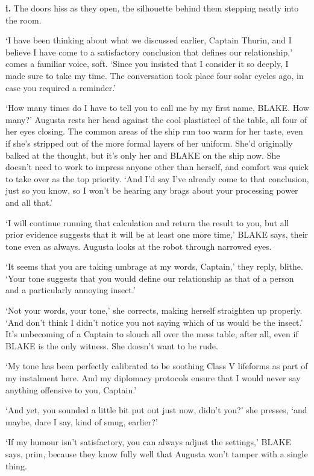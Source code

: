﻿

\textbf{i.}
The doors hiss as they open, the silhouette behind them stepping
neatly into the room.

`I have been thinking about what we discussed earlier, Captain Thurin,
and I believe I have come to a satisfactory conclusion that defines
our relationship,' comes a familiar voice, soft. `Since you insisted
that I consider it so deeply, I made sure to take my time. The
conversation took place four solar cycles ago, in case you required a
reminder.'

`How many times do I have to tell you to call me by my first name,
BLAKE. How many?' Augusta rests her head against the cool plastisteel
of the table, all four of her eyes closing. The common areas of the
ship run too warm for her taste, even if she's stripped out of the
more formal layers of her uniform. She'd originally balked at the
thought, but it's only her and BLAKE on the ship now. She doesn't need
to work to impress anyone other than herself, and comfort was quick to
take over as the top priority. `And I'd say I've already come to that
conclusion, just so you know, so I won't be hearing any brags about
your processing power and all that.'

`I will continue running that calculation and return the result to
you, but all prior evidence suggests that it will be at least one more
time,' BLAKE says, their tone even as always. Augusta looks at the
robot through narrowed eyes.

`It seems that you are taking umbrage at my words, Captain,' they
reply, blithe. `Your tone suggests that you would define our
relationship as that of a person and a particularly annoying insect.'

`Not your words, your tone,' she corrects, making herself straighten
up properly. `And don't think I didn’t notice you not saying which of
us would be the insect.' It’s unbecoming of a Captain to slouch all
over the mess table, after all, even if BLAKE is the only witness. She
doesn't want to be rude.

`My tone has been perfectly calibrated to be soothing Class V
lifeforms as part of my instalment here. And my diplomacy protocols
ensure that I would never say anything offensive to you, Captain.'

`And yet, you sounded a little bit put out just now, didn’t you?' she
presses, `and maybe, dare I say, kind of smug, earlier?'

`If my humour isn't satisfactory, you can always adjust the settings,'
BLAKE says, prim, because they know fully well that Augusta won't
tamper with a single thing.

